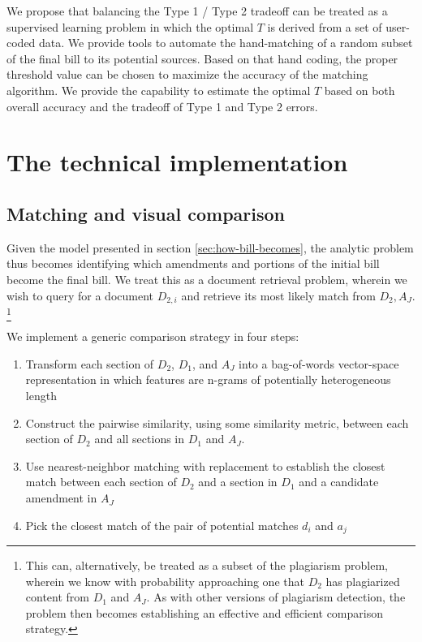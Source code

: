 \documentclass[11pt]{article}
\begin{document}
We propose that balancing the Type 1 / Type 2 tradeoff can be treated
as a supervised learning problem
in which the optimal $T$ is derived from a set of user-coded data. We
provide tools to automate the hand-matching of a random subset of the
final bill to its potential sources. Based on that hand coding, the
proper threshold value can be chosen to maximize the accuracy of the
matching algorithm. We provide the capability to estimate the optimal
$T$ based on both overall accuracy and the tradeoff of Type 1 and Type
2 errors. 


\section{The technical implementation}
\label{sec:legisl-sect-match}



\subsection{Matching and visual comparison}
\label{sec:match-visu-comp}

Given the model presented in section \ref{sec:how-bill-becomes}, the
analytic problem thus becomes identifying which amendments and
portions of the initial bill become the final bill. We treat this as a
document retrieval problem, wherein we wish to query for a document
$D_{2,i}$ and retrieve its most likely match from $D_2,
A_J$. \footnote{This can, alternatively, be treated as a
subset of the plagiarism problem, wherein we know with probability
approaching one that $D_2$ has plagiarized content from $D_1$ and
$A_J$. As with other versions of plagiarism detection, the problem
then becomes establishing an effective and efficient comparison
strategy.}

We implement a generic comparison strategy in four steps:
\begin{enumerate}
\item Transform each section of $D_2$, $D_1$, and $A_J$ into a
  bag-of-words vector-space representation in which features are
  n-grams of potentially heterogeneous length
\item Construct the pairwise similarity, using some similarity metric,
  between each section of $D_2$ and all sections in $D_1$ and $A_J$.
\item Use nearest-neighbor matching with replacement to establish
  the closest match between each section of $D_2$ and a section in
  $D_1$ and a candidate amendment in $A_J$
\item Pick the closest match of the pair of potential matches $d_i$
  and $a_j$
\end{enumerate}
\end{document}
